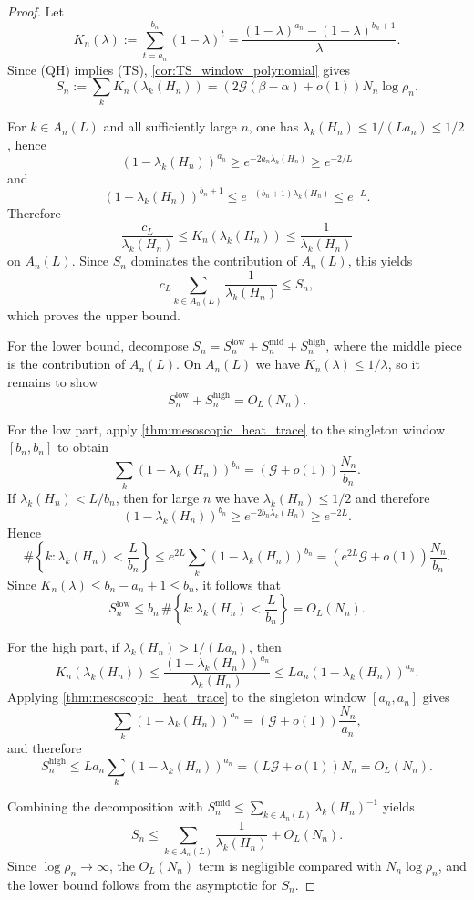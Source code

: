 \documentclass[reqno]{amsart}
\numberwithin{equation}{section}
\theoremstyle{definition}
\theoremstyle{remark}
\newcommand{\Cref}[1]{\autoref{#1}}
\newcommand{\cG}{\mathcal{G}}
\begin{document}
\begin{proof}
Let
\[
  K_n(\lambda)
  :=
  \sum_{t=a_n}^{b_n}(1-\lambda)^t
  =
  \frac{(1-\lambda)^{a_n}-(1-\lambda)^{b_n+1}}{\lambda}.
\]
Since \textup{(QH)} implies \textup{(TS)}, \Cref{cor:TS_window_polynomial} gives
\[
  S_n
  :=
  \sum_k K_n(\lambda_k(H_n))
  =
  \left(2\cG(\beta-\alpha)+o(1)\right)N_n\log\rho_n.
\]

For $k\in A_n(L)$ and all sufficiently large $n$, one has $\lambda_k(H_n)\le 1/(L a_n)\le 1/2$, hence
\[
  (1-\lambda_k(H_n))^{a_n}\ge e^{-2a_n\lambda_k(H_n)}\ge e^{-2/L}
\]
and
\[
  (1-\lambda_k(H_n))^{b_n+1}\le e^{-(b_n+1)\lambda_k(H_n)}\le e^{-L}.
\]
Therefore
\[
  \frac{c_L}{\lambda_k(H_n)}
  \le
  K_n(\lambda_k(H_n))
  \le
  \frac{1}{\lambda_k(H_n)}
\]
on $A_n(L)$. Since $S_n$ dominates the contribution of $A_n(L)$, this yields
\[
  c_L \sum_{k\in A_n(L)} \frac{1}{\lambda_k(H_n)}
  \le
  S_n,
\]
which proves the upper bound.

For the lower bound, decompose $S_n=S_n^{\mathrm{low}}+S_n^{\mathrm{mid}}+S_n^{\mathrm{high}}$, where the middle piece is the contribution of $A_n(L)$. On $A_n(L)$ we have $K_n(\lambda)\le 1/\lambda$, so it remains to show
\[
  S_n^{\mathrm{low}}+S_n^{\mathrm{high}}=O_L(N_n).
\]

For the low part, apply \Cref{thm:mesoscopic_heat_trace} to the singleton window $[b_n,b_n]$ to obtain
\[
  \sum_k (1-\lambda_k(H_n))^{b_n}
  =
  \left(\cG+o(1)\right)\frac{N_n}{b_n}.
\]
If $\lambda_k(H_n)<L/b_n$, then for large $n$ we have $\lambda_k(H_n)\le 1/2$ and therefore
\[
  (1-\lambda_k(H_n))^{b_n}\ge e^{-2b_n\lambda_k(H_n)}\ge e^{-2L}.
\]
Hence
\[
  \#\left\{k:\lambda_k(H_n)<\frac{L}{b_n}\right\}
  \le
  e^{2L}\sum_k (1-\lambda_k(H_n))^{b_n}
  =
  \left(e^{2L}\cG+o(1)\right)\frac{N_n}{b_n}.
\]
Since $K_n(\lambda)\le b_n-a_n+1\le b_n$, it follows that
\[
  S_n^{\mathrm{low}}
  \le
  b_n\,\#\left\{k:\lambda_k(H_n)<\frac{L}{b_n}\right\}
  =
  O_L(N_n).
\]

For the high part, if $\lambda_k(H_n)>1/(L a_n)$, then
\[
  K_n(\lambda_k(H_n))
  \le
  \frac{(1-\lambda_k(H_n))^{a_n}}{\lambda_k(H_n)}
  \le
  L a_n (1-\lambda_k(H_n))^{a_n}.
\]
Applying \Cref{thm:mesoscopic_heat_trace} to the singleton window $[a_n,a_n]$ gives
\[
  \sum_k (1-\lambda_k(H_n))^{a_n}
  =
  \left(\cG+o(1)\right)\frac{N_n}{a_n},
\]
and therefore
\[
  S_n^{\mathrm{high}}
  \le
  L a_n \sum_k (1-\lambda_k(H_n))^{a_n}
  =
  (L\cG+o(1))N_n
  =
  O_L(N_n).
\]

Combining the decomposition with $S_n^{\mathrm{mid}}\le \sum_{k\in A_n(L)}\lambda_k(H_n)^{-1}$ yields
\[
  S_n
  \le
  \sum_{k\in A_n(L)} \frac{1}{\lambda_k(H_n)}
  + O_L(N_n).
\]
Since $\log\rho_n\to\infty$, the $O_L(N_n)$ term is negligible compared with $N_n\log\rho_n$, and the lower bound follows from the asymptotic for $S_n$.
\end{proof}
\end{document}
